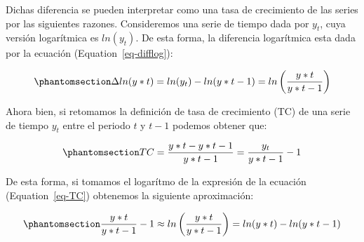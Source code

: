 \documentclass[
  a4paper,
]{article}
\begin{document}
\begin{figure}
\begin{minipage}{\linewidth}
{}

\end{minipage}%
\newline
\begin{minipage}{\linewidth}



\end{minipage}%

\end{figure}%

Dichas diferencia se pueden interpretar como una tasa de crecimiento de
las series por las siguientes razones. Consideremos una serie de tiempo
dada por \(y_t\), cuya versión logarítmica es \(ln(y_t)\). De esta
forma, la diferencia logarítmica esta dada por la ecuación
(Equation~\ref{eq-difflog}):

\begin{equation}\phantomsection\label{eq-difflog}{
\Delta ln(y*t) = ln(y_t) - ln(y*{t-1}) = ln \left( \frac{y*t}{y*{t-1}} \right)
}\end{equation}

Ahora bien, si retomamos la definición de tasa de crecimiento (TC) de
una serie de tiempo \(y_t\) entre el periodo \(t\) y \(t-1\) podemos
obtener que:

\begin{equation}\phantomsection\label{eq-TC}{
TC = \frac{y*t - y*{t-1}}{y*{t-1}} = \frac{y_t}{y*{t-1}} - 1
}\end{equation}

De esta forma, si tomamos el logarítmo de la expresión de la ecuación
(Equation~\ref{eq-TC}) obtenemos la siguiente aproximación:

\begin{equation}\phantomsection\label{eq-TCDiffLog}{
\frac{y*t}{y*{t-1}} -1 \approx ln \left( \frac{y*t}{y*{t-1}} \right) = ln(y*t) - ln(y*{t-1})
}\end{equation}
\end{document}
